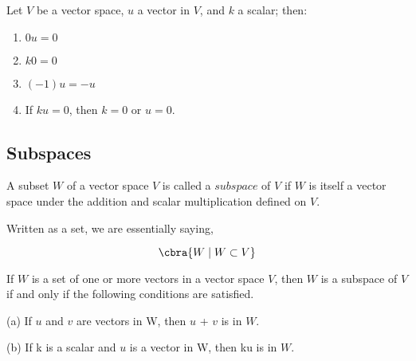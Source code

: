 \documentclass{article}
\begin{document}
\edefn

\bthm
Let $V$ be a vector space, $u$ a vector in $V$, and $k$ a scalar; then:
\begin{enumerate}
    \item $0u=0$ 
    \item $k0=0$ 
    \item $(-1)u=-u$ 
    \item If $ku=0$, then $k=0$ or $u=0$.
\end{enumerate}
\ethm

\pagebreak

\subsection{Subspaces}

\bdefn
A subset $W$ of a vector space $V$ is called a $\textit{subspace}$ of $V$ if $W$ is itself a vector space under the addition and scalar multiplication defined on $V$.

Written as a set, we are essentially saying,

\[
    \cbra{W \mid W \subset V}
\]


\edefn

\bthm
If $W$ is a set of one or more vectors in a vector space $V$, then $W$ is a subspace of $V$ if and only if the following conditions are satisfied.

(a) If $u$ and $v$ are vectors in W, then $u$ + $v$ is in $W$.

(b) If k is a scalar and $u$ is a vector in W, then ku is in $W$.
\ethm
\end{document}
